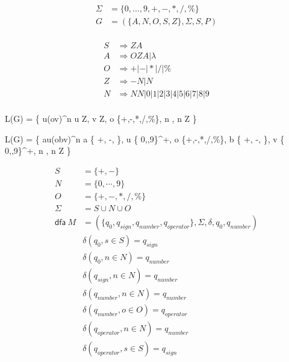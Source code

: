 \begin{align}
\Sigma &= \{0, ..., 9, +, -, *, /, \%\}	\\

G &= \left(\{ A, N, O, S, Z \}, \Sigma, S, P\right) \\
\end{align}

\begin{align}
S & \Rightarrow ZA \\
A & \Rightarrow OZA | \lambda \\
O & \Rightarrow + | - | * | / | \% \\
Z & \Rightarrow -N | N \\
N & \Rightarrow NN | 0 | 1 | 2 | 3 | 4 | 5 | 6 | 7 | 8 | 9 \\
\end{align}

L\left(G\right) = \{
    u\left(ov\right)^n
    \mid
    u \in Z,
    v \in Z,
    o \in \{+,-,*,/,\%\},
    n ,
    n \in Z
\}

L\left(G\right) = \{
    au\left(obv\right)^n
    \mid
    a \in \{ +, -, \lambda \},
    u \in \{ 0,\cdots,9\}^+,
    o \in \{+,-,*,/,\%\},
    b \in \{ +, -, \lambda \},
    v \in \{ 0,\cdots,9\}^+,
    n ,
    n \in Z
\}

\begin{align}
S &= \{ +, - \}\\
N &= \{ 0, \cdots, 9 \} \\
O &= \{ +, -, *, /, \% \} \\
\Sigma &= S \cup N \cup O \\
\mathsf{dfa}\ M &= (\{q_0,q_{sign},q_{number},q_{operator}\},\Sigma,\delta,q_0,q_{number}) \\
&\delta(q_0, s \in S) = q_{sign} \\
&\delta(q_0, n \in N) = q_{number} \\
&\delta(q_{sign}, n \in N) = q_{number} \\
&\delta(q_{number}, n \in N) = q_{number} \\
&\delta(q_{number}, o \in O) = q_{operator} \\
&\delta(q_{operator}, n \in N) = q_{number} \\
&\delta(q_{operator}, s \in S) = q_{sign} \\
\end{align}
